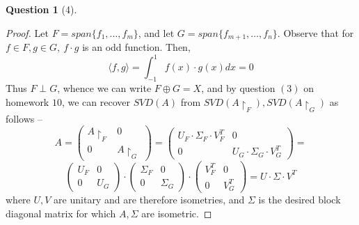 \documentclass[11pt]{article}
\theoremstyle{quest}
\newtheorem*{question}{Question}
\begin{document}
\begin{question}[4]
\end{question}
\begin{proof}
Let $F = span\{f_1, \ldots, f_m\}$, and let $G = span\{f_{m+1}, \ldots, f_n\}$. Observe that for $f \in F, g \in G,\ f \cdot g$ is an odd function. Then,
$$\langle f, g \rangle = \int_{-1}^{1} f(x) \cdot g(x) dx = 0$$
Thus $F \perp G$, whence we can write $F \oplus G = X$, and by question $(3)$ on homework $10$, we can recover $SVD(A)$ from $SVD(A \restriction_F), SVD(A \restriction_G)$ as follows --
$$A = \begin{pmatrix}
A \restriction_F & 0 \\
0 & A \restriction_G
\end{pmatrix}  = \begin{pmatrix}
U_F \cdot \Sigma_F \cdot V_F^T & 0 \\
0 & U_G \cdot \Sigma_G \cdot V_G^T
\end{pmatrix} =$$
$$\begin{pmatrix}
U_F& 0 \\
0 & U_G
\end{pmatrix} \cdot \begin{pmatrix}
\Sigma_F& 0 \\
0 & \Sigma_G
\end{pmatrix} \cdot \begin{pmatrix}
V_F^T& 0 \\
0 & V_G^T
\end{pmatrix} = U \cdot \Sigma \cdot V^T$$
where $U, V$ are unitary and are therefore isometries, and $\Sigma$ is the desired block diagonal matrix for which $A, \Sigma$ are isometric.
\end{proof}
\end{document}
